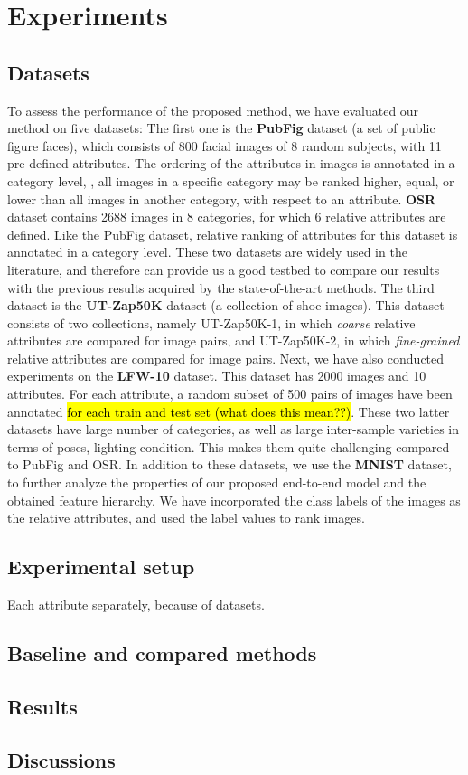 

\section{Experiments}
\label{sec.4}

\subsection{Datasets}
To assess the performance of the proposed method, we have evaluated our method on five datasets:
The first one is the \textbf{PubFig} \cite{pubfig} dataset (a set of public figure faces), which consists of 800 facial images of 8 random subjects, with 11 pre-defined attributes. The ordering of the attributes in images is annotated in a category level, \ie, all images in a specific category may be ranked higher, equal, or lower than all images in another category, with respect to an attribute.
\textbf{OSR} \cite{oliva2001modeling} dataset contains 2688 images in 8 categories, for which 6 relative attributes are defined. Like the PubFig dataset, relative ranking of attributes for this dataset is annotated in a category level. These two datasets are widely used in the literature, and therefore can provide us a good testbed to compare our results with the previous results acquired by the state-of-the-art methods. 
The third dataset is the  \textbf{UT-Zap50K} \cite{Yu2014} dataset (a collection of shoe images). This dataset consists of two collections, namely UT-Zap50K-1, in which \textit{coarse} relative attributes are compared for image pairs, and UT-Zap50K-2, in which \textit{fine-grained} relative attributes are compared for image pairs.  
Next, we have also conducted experiments on the \textbf{LFW-10} \cite{Sandeep_2014_CVPR} dataset. This dataset has 2000 images and 10 attributes. For each attribute, a random subset of 500 pairs of images have been annotated \hl{for each train and test set (what does this mean??)}. These two latter datasets have large number of categories, as well as large inter-sample varieties in terms of poses, lighting condition. This makes them quite challenging compared to PubFig and OSR.
In addition to these datasets, we use the \textbf{MNIST} \cite{lecun1998mnist} dataset, to further analyze the properties of our proposed end-to-end model and the obtained feature hierarchy. We have incorporated the class labels of the images as the relative attributes, and used the label values to rank images.
\subsection{Experimental setup}

Each attribute separately, because of datasets.
\subsection{Baseline and compared methods}
\subsection{Results}
\subsection{Discussions}

